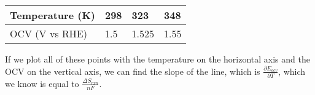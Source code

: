 \documentclass[12pt]{article}
\begin{document}
\begin{center}
\begin{tabular}{llll}
\hline\hline
Temperature (K) & 298 & 323 & 348 \\
\hline
OCV (V vs RHE) & 1.5 & 1.525 & 1.55 \\
\hline\hline
\end{tabular}
\end{center}
If we plot all of these points with the temperature on the horizontal axis and the OCV on the vertical axis, we can find the slope of the line, which is $\frac{\partial E_{ocv}}{\partial T}$, which we know is equal to $\frac{\Delta S_{rxn}}{nF}$.
\end{document}
